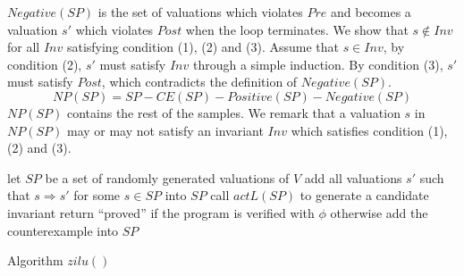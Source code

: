 $Negative(SP)$ is the set of valuations which violates $Pre$ and becomes a valuation $s'$ which violates $Post$ when the loop terminates. We show that $s \not \in Inv$ for all $Inv$ satisfying condition (1), (2) and (3). Assume that $s \in Inv$, by condition (2), $s'$ must satisfy $Inv$ through a simple induction. By condition (3), $s'$ must satisfy $Post$, which contradicts the definition of $Negative(SP)$.
\[    NP(SP) = SP - CE(SP) - Positive(SP) - Negative(SP)
\]
$NP(SP)$ contains the rest of the samples. We remark that a valuation $s$ in $NP(SP)$ may or may not satisfy an invariant $Inv$ which satisfies condition (1), (2) and (3).

\begin{algorithm}[t]
\SetAlgoVlined
\Indm
\Indp
let $SP$ be a set of randomly generated valuations of $V$\;
 {
    add all valuations $s'$ such that $s \Rightarrow s'$ for some $s \in SP$ into $SP$\;
    call $actL(SP)$ to generate a candidate invariant\;
    return ``proved'' if the program is verified with $\phi$ otherwise add the counterexample into $SP$\;
}
\caption{Algorithm $zilu()$}
\label{alg:active}
\end{algorithm}


